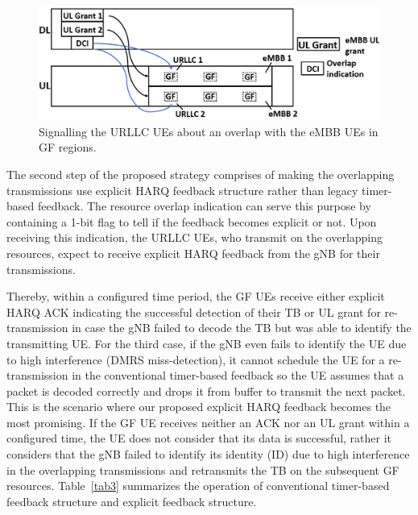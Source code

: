\documentclass[conference]{IEEEtran}
\begin{document}
\begin{figure}[htbp]
\centerline{\includegraphics[scale=0.22]{fig2.PNG}}
\caption{Signalling the URLLC UEs about an overlap with the eMBB UEs in GF regions.}
\label{fig2}
\vspace{-2mm}
\end{figure}

The second step of the proposed strategy comprises of making the overlapping transmissions use explicit HARQ feedback structure rather than legacy timer-based feedback. The resource overlap indication can serve this purpose by containing a 1-bit flag to tell if the feedback becomes explicit or not. Upon receiving this indication, the URLLC UEs, who transmit on the overlapping resources, expect to receive explicit HARQ feedback from the gNB for their transmissions. 

Thereby, within a configured time period, the GF UEs receive either explicit HARQ ACK indicating the successful detection of their TB or UL grant for re-transmission in case the gNB failed to decode the TB but was able to identify the transmitting UE.  For the third case, if the gNB even fails to identify the UE due to high interference (DMRS miss-detection), it cannot schedule the UE for a re-transmission in the conventional timer-based feedback so the UE assumes that a packet is decoded correctly and drops it from buffer to transmit the next packet. This is the scenario where our proposed explicit HARQ feedback becomes the most promising. If the GF UE receives neither an ACK nor an UL grant within a configured time, the UE does not consider that its data is successful, rather it considers that the gNB failed to identify its identity (ID) due to high interference in the overlapping transmissions and retransmits the TB on the subsequent GF resources. Table~\ref{tab3} summarizes the operation of conventional timer-based feedback structure and explicit feedback structure.
\end{document}
